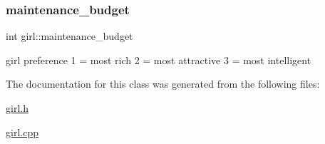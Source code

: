 \subsubsection{\texorpdfstring{maintenance\+\_\+budget}{maintenance\_budget}}
{\footnotesize\ttfamily int girl\+::maintenance\+\_\+budget}



girl preference \textquotesingle{}1\textquotesingle{} = most rich \textquotesingle{}2\textquotesingle{} = most attractive \textquotesingle{}3\textquotesingle{} = most intelligent 



The documentation for this class was generated from the following files\+:\begin{DoxyCompactItemize}
\item 
\hyperlink{girl_8h}{girl.\+h}\item 
\hyperlink{girl_8cpp}{girl.\+cpp}\end{DoxyCompactItemize}
